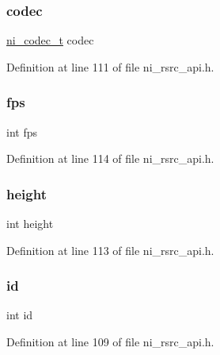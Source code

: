 \subsubsection{\texorpdfstring{codec}{codec}}
{\footnotesize\ttfamily \mbox{\hyperlink{ni__rsrc__api_8h_a9945b3a5098e949d3e596e6f778e01bc}{ni\+\_\+codec\+\_\+t}} codec}



Definition at line 111 of file ni\+\_\+rsrc\+\_\+api.\+h.

\mbox{\label{struct__ni__sw__instance__info_a45b67662d620a977a2cfe519f7ab6273}} 
\subsubsection{\texorpdfstring{fps}{fps}}
{\footnotesize\ttfamily int fps}



Definition at line 114 of file ni\+\_\+rsrc\+\_\+api.\+h.

\mbox{\label{struct__ni__sw__instance__info_ad12fc34ce789bce6c8a05d8a17138534}} 
\subsubsection{\texorpdfstring{height}{height}}
{\footnotesize\ttfamily int height}



Definition at line 113 of file ni\+\_\+rsrc\+\_\+api.\+h.

\mbox{\label{struct__ni__sw__instance__info_a7441ef0865bcb3db9b8064dd7375c1ea}} 
\subsubsection{\texorpdfstring{id}{id}}
{\footnotesize\ttfamily int id}



Definition at line 109 of file ni\+\_\+rsrc\+\_\+api.\+h.

